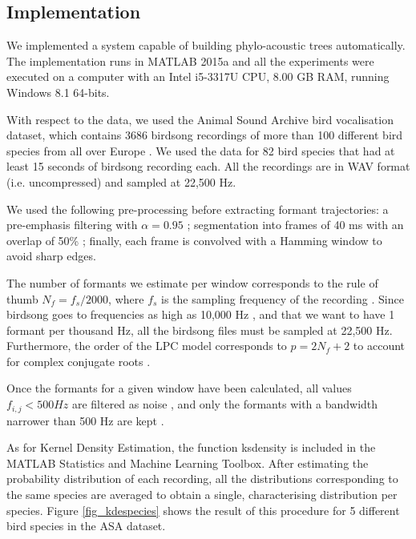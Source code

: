 \documentclass[pdftex,11pt,a4paper]{article}
\theoremstyle{definition}
\theoremstyle{remark}
\begin{document}
\subsection{Implementation}
We implemented a system capable of building phylo-acoustic trees automatically. The implementation runs in MATLAB 2015a and all the experiments were executed on a computer with an Intel i5-3317U CPU, 8.00 GB RAM, running Windows 8.1 64-bits. 
\par With respect to the data, we used the Animal Sound Archive bird vocalisation dataset, which contains 3686 birdsong recordings of more than 100 different bird species from all over Europe \cite{AnimalSoundArchive2015}. We used the data for 82 bird species that had at least 15 seconds of birdsong recording each. All the recordings are in WAV format (i.e. uncompressed) and sampled at 22,500 Hz.
\par We used the following pre-processing before extracting formant trajectories: a pre-emphasis filtering with $\alpha = 0.95$ ; segmentation into frames of 40 ms with an overlap of 50\% \cite{Stowell2014}; finally, each frame is convolved with a Hamming window to avoid sharp edges. 
\par The number of formants we estimate per window corresponds to the rule of thumb $N_f = f_s / 2000$, where $f_s$ is the sampling frequency of the recording \cite{markel1976}. Since birdsong goes to frequencies as high as 10,000 Hz \cite{Marler2004}, and that we want to have 1 formant per thousand Hz, all the birdsong files must be sampled at 22,500 Hz. Furthermore, the order of the LPC model corresponds to $p = 2N_f + 2$ to account for complex conjugate roots \cite{Benesty}. 
\par Once the formants for a given window have been calculated, all values $f_{i, j} < 500 Hz$ are filtered as noise \cite{Stowell2014}, and only the formants with a bandwidth narrower than 500 Hz are kept \cite{Mathworks2015}. 
\par As for Kernel Density Estimation, the function ksdensity is included in the MATLAB Statistics and Machine Learning Toolbox. After estimating the probability distribution of each recording, all the distributions corresponding to the same species are averaged to obtain a single, characterising distribution per species. Figure \ref{fig_kdespecies} shows the result of this procedure for 5 different bird species in the ASA dataset.
\end{document}
